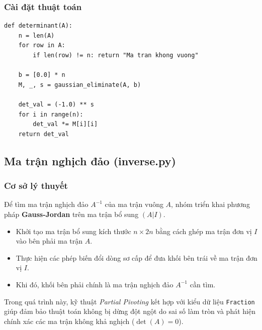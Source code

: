 \documentclass[a4paper,12pt]{article}
\begin{document}
\subsubsection{Cài đặt thuật toán}
\begin{lstlisting}[caption=Mã nguồn tính định thức]
def determinant(A):
    n = len(A)
    for row in A:
        if len(row) != n: return "Ma tran khong vuong"
    
    b = [0.0] * n
    M, _, s = gaussian_eliminate(A, b)
    
    det_val = (-1.0) ** s
    for i in range(n):
        det_val *= M[i][i]
    return det_val
\end{lstlisting}

\subsection{Ma trận nghịch đảo (inverse.py)}

\subsubsection{Cơ sở lý thuyết}
Để tìm ma trận nghịch đảo $A^{-1}$ của ma trận vuông $A$, nhóm triển khai phương pháp \textbf{Gauss-Jordan} trên ma trận bổ sung $(A|I)$. 
\begin{itemize}
    \item Khởi tạo ma trận bổ sung kích thước $n \times 2n$ bằng cách ghép ma trận đơn vị $I$ vào bên phải ma trận $A$.
    \item Thực hiện các phép biến đổi dòng sơ cấp để đưa khối bên trái về ma trận đơn vị $I$. 
    \item Khi đó, khối bên phải chính là ma trận nghịch đảo $A^{-1}$ cần tìm.
\end{itemize}
Trong quá trình này, kỹ thuật \textit{Partial Pivoting} kết hợp với kiểu dữ liệu \texttt{Fraction} giúp đảm bảo thuật toán không bị dừng đột ngột do sai số làm tròn và phát hiện chính xác các ma trận không khả nghịch ($\det(A) = 0$).
\end{document}
